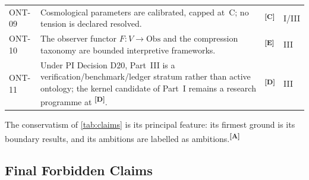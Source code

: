 \documentclass[12pt,a4paper,twoside]{article}
\theoremstyle{plain}
\theoremstyle{definition}
\theoremstyle{remark}
\newcommand{\catmark}[1]{\textsuperscript{\textsf{\textbf{[#1]}}}}
\begin{document}
{\begin{longtable}{p{} p{} p{} p{}}
ONT-09 & Cosmological parameters are calibrated, capped at~C; no tension is declared resolved. & \catmark{C} & I/III \\
ONT-10 & The observer functor $F\colon V\to\mathrm{Obs}$ and the compression taxonomy are bounded interpretive frameworks. & \catmark{E} & III \\
ONT-11 & Under PI Decision D20, Part~III is a verification/benchmark/ledger stratum rather than active ontology; the kernel candidate of Part~I remains a research programme at \catmark{D}. & \catmark{D} & III \\
\end{longtable}
}

\noindent The conservatism of \cref{tab:claims} is its principal
feature: its firmest ground is its boundary results, and its ambitions
are labelled as ambitions.\catmark{A}

\subsection{Final Forbidden Claims}
\label{subsec:forbidden-claims}
\end{document}
